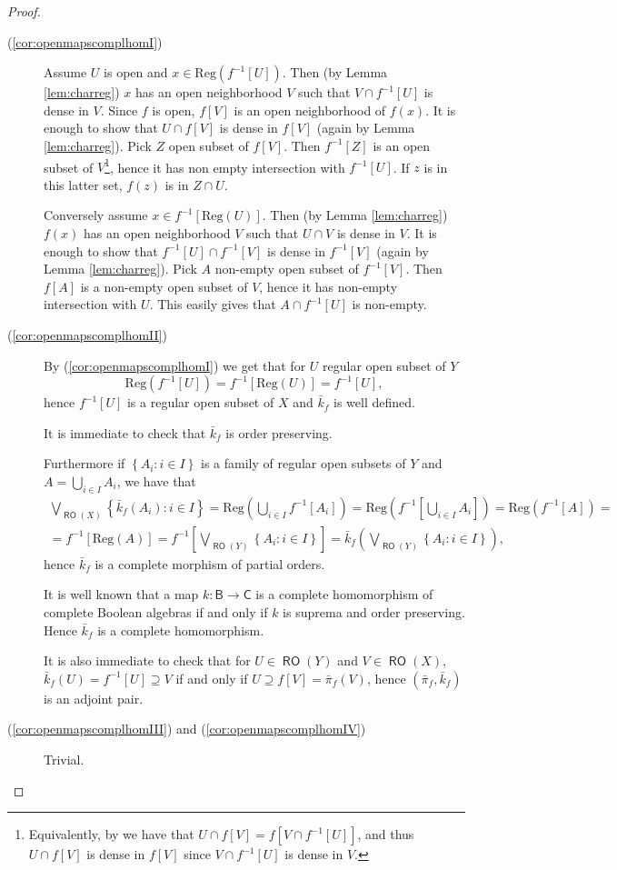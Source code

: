 \documentclass[11pt]{amsart}
\theoremstyle{plain}
\theoremstyle{definition}
\theoremstyle{plain}
\theoremstyle{remark}
\DeclareMathOperator{\RO}{\mathsf{RO}}
\newcommand{\bool}[1]{\mathsf{#1}}
\newcommand{\Reg}[1]{\mathrm{Reg}\left(#1\right)}
\newcommand{\bp}[1]{\left\lbrace #1 \right\rbrace}
\newcommand{\0}{\mathsf{0}}
\renewcommand{\1}{\mathsf{1}}
\renewcommand{\2}{\mathsf{2}}
\theoremstyle{definition}
\begin{document}
\begin{proof}
\emph{}

\begin{description}
\item[(\ref{cor:openmapscomplhomI})]
Assume $U$ is open and $x\in \Reg{f^{-1}[U]}$. Then (by Lemma \ref{lem:charreg}) $x$ has an open neighborhood $V$ such that $V\cap f^{-1}[U]$ is dense in $V$. Since $f$ is open, $f[V]$ is an open neighborhood of $f(x)$. It is enough to show that
$U\cap f[V]$ is dense in $f[V]$ (again by Lemma \ref{lem:charreg}). Pick $Z$ open subset of $f[V]$. Then $f^{-1}[Z]$ is an open subset of $V$\footnote{Equivalently, by \cite[Lemma 1.5.3, Chapter C1]{JohnElephant} we have that $U\cap f[V]=f[V\cap f^{-1}[U]]$, and thus $U\cap f[V]$ is dense in $f[V]$ since $V\cap f^{-1}[U]$ is dense in $V$.},
hence it has non empty intersection with $f^{-1}[U]$. If $z$ is in this latter set, $f(z)$ is in $Z\cap U$. 

Conversely assume $x\in f^{-1}[\Reg{U}]$. Then (by Lemma \ref{lem:charreg}) $f(x)$ has an open neighborhood $V$ such that
$U\cap V$ is dense in $V$. It is enough to show that
$f^{-1}[U]\cap f^{-1}[V]$ is dense in $f^{-1}[V]$ (again by Lemma \ref{lem:charreg}). Pick $A$ non-empty  open subset of $f^{-1}[V]$.
Then $f[A]$ is a non-empty open subset of $V$, hence it has non-empty intersection with $U$. This easily gives
that $A\cap f^{-1}[U]$ is non-empty.

\item[(\ref{cor:openmapscomplhomII})]
By (\ref{cor:openmapscomplhomI}) we get that for $U$ regular open subset of $Y$
\[
\Reg{f^{-1}[U]}=f^{-1}[\Reg{U}]=f^{-1}[U],
\]
hence $f^{-1}[U]$ is a regular open subset of $X$ and $\bar{k}_f$ is well defined.

It is immediate to check that $\bar{k}_f$ is order preserving.

Furthermore
if $\bp{A_i:i\in I}$ is a family of regular open subsets of $Y$ and $A=\bigcup_{i\in I}A_i$, we have that
\begin{align*}
\bigvee_{\RO(X)}\bp{\bar{k}_f(A_i):i\in I}=\Reg{\bigcup_{i\in I}f^{-1}[A_i]}=\Reg{f^{-1}[\bigcup_{i\in I}A_i]}=
\Reg{f^{-1}[A]}=\\
=f^{-1}[\Reg{A}]=f^{-1}[\bigvee_{\RO(Y)}\bp{A_i:i\in I}]=\bar{k}_f(\bigvee_{\RO(Y)}\bp{A_i:i\in I}),
\end{align*}
hence $\bar{k}_f$ is a complete morphism of partial orders.

It is well known that a map $k:\bool{B}\to\bool{C}$ is a complete homomorphism of complete Boolean algebras if and only if $k$ is suprema and order preserving. Hence $\bar{k}_f$ is a complete homomorphism.

It is also immediate to check that for $U\in\RO(Y)$ and $V\in\RO(X)$,
$\bar{k}_f(U)=f^{-1}[U]\supseteq V$ if and only if $U\supseteq f[V]=\bar{\pi}_f(V)$, hence 
$(\bar{\pi}_f, \bar{k}_f)$ is an adjoint pair.
\item[(\ref{cor:openmapscomplhomIII}) and (\ref{cor:openmapscomplhomIV})] Trivial.
\end{description}
\end{proof}
\end{document}

